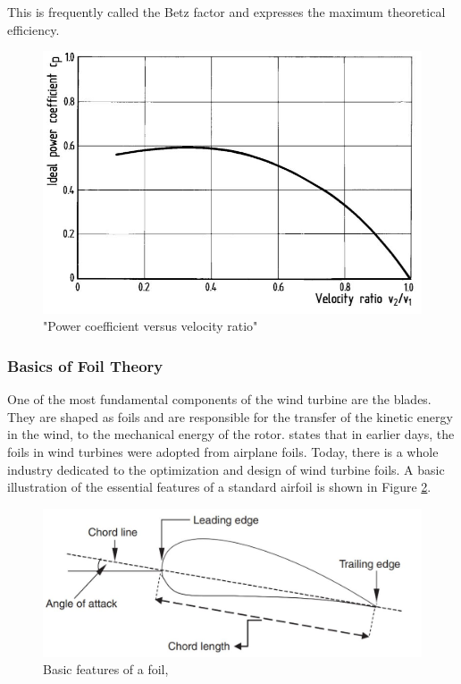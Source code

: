 \noindent This is frequently called the Betz factor and expresses the maximum theoretical efficiency. 
\begin{figure}[H]
\centering
\includegraphics[scale=0.6]{figures/idealflow}
\caption[$\; \:$Power coefficient versus velocity ratio]{"Power coefficient versus velocity ratio" \cite{Hau2013} }
 \label{fig:idealflow}
\end{figure}

\subsubsection{Basics of Foil Theory}
One of the most fundamental components of the wind turbine are the blades. They are shaped as foils and are responsible for the transfer of the kinetic energy in the wind, to the mechanical energy of the rotor. \cite{MATHEW2012} states that in earlier days, the foils in wind turbines were adopted from airplane foils. Today,  there is a whole industry dedicated to the optimization and design of wind turbine foils. A basic illustration of the essential features of a standard airfoil is shown in Figure \ref{fig:foil}.  

\begin{figure}[H]
\centering
\includegraphics[scale=0.6]{figures/foil}
\caption[$\; \:$Basic features of a foil]{Basic features of a foil, \cite{MATHEW2012} }
 \label{fig:foil}
\end{figure}

